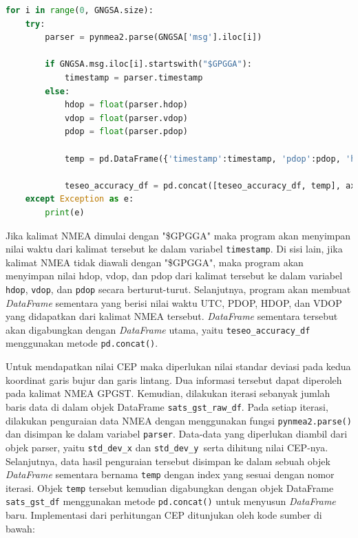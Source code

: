 \begin{lstlisting}[language=python]
for i in range(0, GNGSA.size):
	try:
		parser = pynmea2.parse(GNGSA['msg'].iloc[i])
		
		if GNGSA.msg.iloc[i].startswith("$GPGGA"):
			timestamp = parser.timestamp
		else:
			hdop = float(parser.hdop)
			vdop = float(parser.vdop)
			pdop = float(parser.pdop)
			
			temp = pd.DataFrame({'timestamp':timestamp, 'pdop':pdop, 'hdop':hdop, 'vdop':vdop}, index=[i])
			
			teseo_accuracy_df = pd.concat([teseo_accuracy_df, temp], axis=0)
	except Exception as e:
		print(e)
\end{lstlisting}

Jika kalimat NMEA dimulai dengan "\$GPGGA" maka program akan menyimpan nilai waktu dari kalimat tersebut ke dalam variabel \texttt{timestamp}. Di sisi lain, jika kalimat NMEA tidak diawali dengan "\$GPGGA", maka program akan menyimpan nilai hdop, vdop, dan pdop dari kalimat tersebut ke dalam variabel \texttt{hdop}, \texttt{vdop}, dan \texttt{pdop} secara berturut-turut. Selanjutnya, program akan membuat \textit{DataFrame} sementara yang berisi nilai waktu UTC, PDOP, HDOP, dan VDOP yang didapatkan dari kalimat NMEA tersebut. \textit{DataFrame} sementara tersebut akan digabungkan dengan \textit{DataFrame} utama, yaitu \texttt{teseo\_accuracy\_df} menggunakan metode \texttt{pd.concat()}.

Untuk mendapatkan nilai CEP maka diperlukan nilai standar deviasi pada kedua koordinat garis bujur dan garis lintang. Dua informasi tersebut dapat diperoleh pada kalimat NMEA GPGST. Kemudian, dilakukan iterasi sebanyak jumlah baris data di dalam objek DataFrame \texttt{sats\_gst\_raw\_df}. Pada setiap iterasi, dilakukan penguraian data NMEA dengan menggunakan fungsi \texttt{pynmea2.parse()} dan disimpan ke dalam variabel \texttt{parser}. Data-data yang diperlukan diambil dari objek parser, yaitu \texttt{std\_dev\_x} dan \texttt{std\_dev\_y }serta dihitung nilai CEP-nya. Selanjutnya, data hasil penguraian tersebut disimpan ke dalam sebuah objek \textit{DataFrame} sementara bernama \texttt{temp} dengan index yang sesuai dengan nomor iterasi. Objek \texttt{temp} tersebut kemudian digabungkan dengan objek DataFrame \texttt{sats\_gst\_df} menggunakan metode \texttt{pd.concat()} untuk menyusun \textit{DataFrame} baru. Implementasi dari perhitungan CEP ditunjukan oleh kode sumber di bawah:

